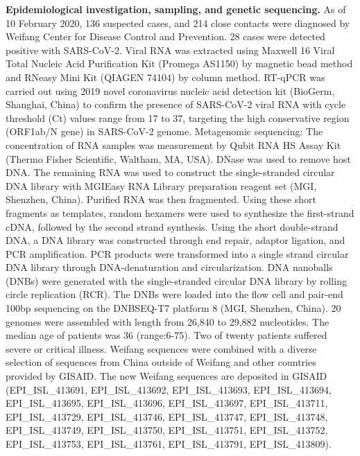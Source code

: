 \documentclass[9pt,lineno,onehalfspacing]{elife}
\begin{document}
{\flushleft\bf Epidemiological investigation, sampling, and genetic sequencing.}
As of 10 February 2020, 136 suspected cases, and 214 close contacts were diagnosed by
Weifang Center for Disease Control and Prevention. 28 cases were detected positive with
SARS-CoV-2. Viral RNA was extracted using Maxwell 16 Viral Total Nucleic Acid
Purification Kit (Promega AS1150) by magnetic bead method and RNeasy Mini Kit
(QIAGEN 74104) by column method. RT-qPCR was carried out using 2019 novel
coronavirus nucleic acid detection kit (BioGerm, Shanghai, China) to confirm the presence of
SARS-CoV-2 viral RNA with cycle threshold (Ct) values range from 17 to 37, targeting the
high conservative region (ORF1ab/N gene) in SARS-CoV-2 genome.
Metagenomic sequencing:
The concentration of RNA samples was measurement by Qubit RNA HS Assay Kit (Thermo
Fisher Scientific, Waltham, MA, USA). DNase was used to remove host DNA. The
remaining RNA was used to construct the single-stranded circular DNA library with
MGIEasy RNA Library preparation reagent set (MGI, Shenzhen, China). Purified RNA was
then fragmented. Using these short fragments as templates, random hexamers were used to
synthesize the first-strand cDNA, followed by the second strand synthesis. Using the short
double-strand DNA, a DNA library was constructed through end repair, adaptor ligation, and
PCR amplification. PCR products were transformed into a single strand circular DNA library
through DNA-denaturation and circularization. DNA nanoballs (DNBs) were generated with
the single-stranded circular DNA library by rolling circle replication (RCR). The DNBs were
loaded into the flow cell and pair-end 100bp sequencing on the DNBSEQ-T7 platform 8
(MGI, Shenzhen, China).
20 genomes were assembled with length from 26,840 to 29,882 nucleotides.
The median age of patients was 36 (range:6-75). Two of twenty patients suffered severe or critical illness. 
Weifang sequences were combined with a diverse selection of sequences from China outside of Weifang and other countries provided by GISAID\cite{elbe2017data}. 
The new Weifang sequences are deposited in GISAID (EPI\_ISL\_413691, EPI\_ISL\_413692, EPI\_ISL\_413693, EPI\_ISL\_413694, EPI\_ISL\_413695, EPI\_ISL\_413696, EPI\_ISL\_413697, EPI\_ISL\_413711, EPI\_ISL\_413729, EPI\_ISL\_413746, EPI\_ISL\_413747, EPI\_ISL\_413748, EPI\_ISL\_413749, EPI\_ISL\_413750, EPI\_ISL\_413751, EPI\_ISL\_413752, EPI\_ISL\_413753, EPI\_ISL\_413761, EPI\_ISL\_413791, EPI\_ISL\_413809). 
\end{document}
